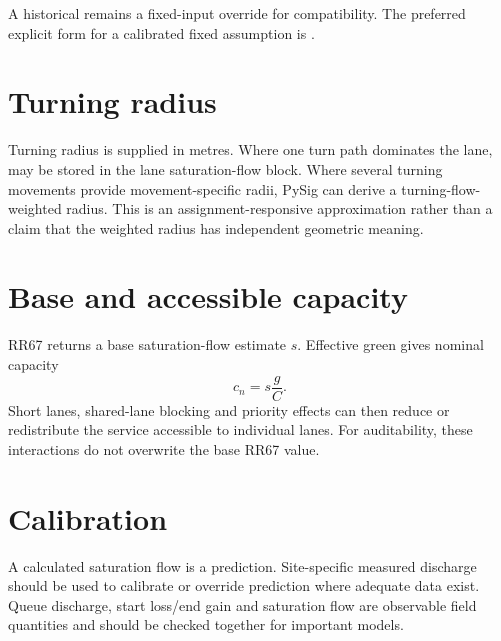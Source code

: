 A historical  remains a fixed-input override for compatibility.
The preferred explicit form for a calibrated fixed assumption is
.

\section{Turning radius}
Turning radius is supplied in metres.  Where one turn path dominates the lane,
 may be stored in the lane saturation-flow block.  Where several
turning movements provide movement-specific radii, PySig can derive a turning-flow-
weighted radius.  This is an assignment-responsive approximation rather than a claim
that the weighted radius has independent geometric meaning.

\section{Base and accessible capacity}
RR67 returns a base saturation-flow estimate $s$.  Effective green gives nominal
capacity
\begin{equation}
c_n=s\frac{g}{C}.
\end{equation}
Short lanes, shared-lane blocking and priority effects can then reduce or redistribute
the service accessible to individual lanes.  For auditability, these interactions do
not overwrite the base RR67 value.

\section{Calibration}
A calculated saturation flow is a prediction.  Site-specific measured discharge should
be used to calibrate or override prediction where adequate data exist.  Queue discharge,
start loss/end gain and saturation flow are observable field quantities and should be
checked together for important models.
